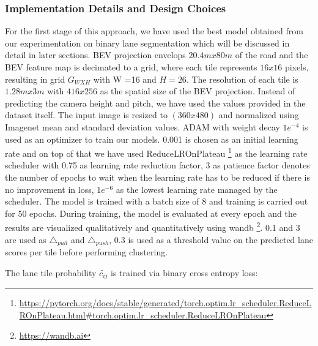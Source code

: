         \subsubsection{Implementation Details and Design Choices }
        For the first stage of this approach, we have used the best model obtained from our experimentation on binary lane segmentation which will be discussed in detail in later sections. BEV projection envelops $20.4m x 80m$ of the road and the BEV feature map is decimated to a grid, where each tile represents $16x16$ pixels, resulting in grid $G_{WXH}$ with W =16 and $H =26$. The resolution of each tile is $1.28m x 3m$ with $416x256$ as the spatial size of the BEV projection. Instead of predicting the camera height and pitch, we have used the values provided in the dataset itself.  The input image is
        resized to $(360x480)$ and normalized using Imagenet\cite{deng2009imagenet} mean and standard deviation values. ADAM with weight decay $1e^{−4}$ is used as an optimizer to train our models. 0.001 is chosen as an initial learning rate and on top of that we have used ReduceLROnPlateau \footnote{\url{https://pytorch.org/docs/stable/generated/torch.optim.lr_scheduler.ReduceLROnPlateau.html#torch.optim.lr_scheduler.ReduceLROnPlateau}} as the learning rate scheduler with 0.75 as learning rate reduction factor, 3 as patience factor denotes the number of epochs to wait when the learning rate has to be reduced if there is no improvement in loss, $1e^{−6}$ as the lowest learning rate managed by the scheduler. The model is trained with a batch size of 8 and training is carried out for 50 epochs. During training, the model is evaluated at every epoch and the results are visualized qualitatively and quantitatively using wandb \footnote{\url{https://wandb.ai}}. 0.1 and 3 are used as $\triangle_{pull}$ and $\triangle_{push}$, 0.3 is used as a threshold value on the predicted lane scores per tile before performing clustering.
        

             The lane tile probability $\widetilde{c_{ij}}$ is trained via binary cross entropy loss:

